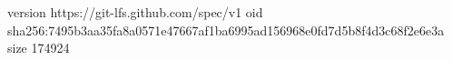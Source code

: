 version https://git-lfs.github.com/spec/v1
oid sha256:7495b3aa35fa8a0571e47667af1ba6995ad156968e0fd7d5b8f4d3c68f2e6e3a
size 174924
